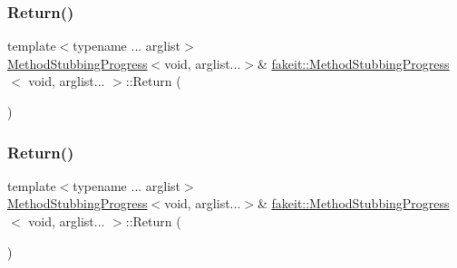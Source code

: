\mbox{\label{structfakeit_1_1MethodStubbingProgress_3_01void_00_01arglist_8_8_8_01_4_ada79edce54db3ffaa88985829f9b5558}} 
\subsubsection{\texorpdfstring{Return()}{Return()}\hspace{0.1cm}{\footnotesize\ttfamily [10/18]}}
{\footnotesize\ttfamily template$<$typename ... arglist$>$ \\
\mbox{\hyperlink{structfakeit_1_1MethodStubbingProgress}{Method\+Stubbing\+Progress}}$<$void, arglist...$>$\& \mbox{\hyperlink{structfakeit_1_1MethodStubbingProgress}{fakeit\+::\+Method\+Stubbing\+Progress}}$<$ void, arglist... $>$\+::Return (\begin{DoxyParamCaption}{ }\end{DoxyParamCaption})\hspace{0.3cm}{\ttfamily [inline]}}

\mbox{\label{structfakeit_1_1MethodStubbingProgress_3_01void_00_01arglist_8_8_8_01_4_ada79edce54db3ffaa88985829f9b5558}} 
\subsubsection{\texorpdfstring{Return()}{Return()}\hspace{0.1cm}{\footnotesize\ttfamily [11/18]}}
{\footnotesize\ttfamily template$<$typename ... arglist$>$ \\
\mbox{\hyperlink{structfakeit_1_1MethodStubbingProgress}{Method\+Stubbing\+Progress}}$<$void, arglist...$>$\& \mbox{\hyperlink{structfakeit_1_1MethodStubbingProgress}{fakeit\+::\+Method\+Stubbing\+Progress}}$<$ void, arglist... $>$\+::Return (\begin{DoxyParamCaption}{ }\end{DoxyParamCaption})\hspace{0.3cm}{\ttfamily [inline]}}

